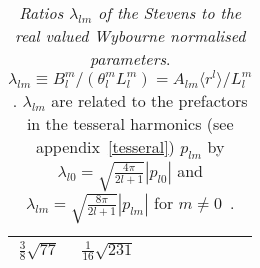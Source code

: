 \begin{table}[h]
\begin{center}
\begin{tabular}{c|ccccccc}
            $\frac{3}{8}\sqrt{77}$ & $\frac{1}{16}\sqrt{231}$ \\
      \hline
    \end{tabular}
    \caption{\emph{Ratios $\lambda_{lm}$ of the Stevens to the real valued
 Wybourne normalised parameters}.
$\lambda_{lm} \equiv B_l^m/(\theta_l^mL_l^m)= A_{lm}\langle r^l \rangle / L_l^m$. 
$ \lambda_{lm}$ are related to the prefactors in the 
tesseral harmonics (see appendix~\ref{tesseral}) $p_{lm}$ by 
$\lambda_{l0} =\sqrt{\frac{4\pi}{2l+1}}|p_{l0}|$ and
$\lambda_{lm} =\sqrt{\frac{8\pi}{2l+1}}|p_{lm}|$ for $m \neq 0$~\cite[note that Newman on p.30, equ (2.7) defines
his real valued Wybourne 
parameters $B_m^l({\rm Newman})\equiv (-1)^m L_l^m$]{newman00-1}.} \label{tab:wytostev}
  \end{center}
\end{table}
\clearpage